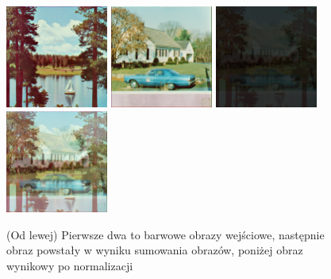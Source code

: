 \documentclass[final,a4paper,openany,12pt]{mwbk}
\begin{document}
\begin{figure}[H]
	\begin{center}
		\includegraphics[width=0.3\textwidth]{1/1Color_Sum_Img1_Original}
		\includegraphics[width=0.3\textwidth]{1/1Color_Sum_Img2_Original}
		\includegraphics[width=0.3\textwidth]{1/1Color_Sum_Img_Result}
		\includegraphics[width=0.3\textwidth]{1/1Color_Sum_Img_Result_Norm}
	\end{center}
	\caption{(Od lewej) Pierwsze dwa to barwowe obrazy wejściowe, następnie obraz powstały w wyniku sumowania obrazów, poniżej obraz wynikowy po normalizacji }
\end{figure}
\end{document}
